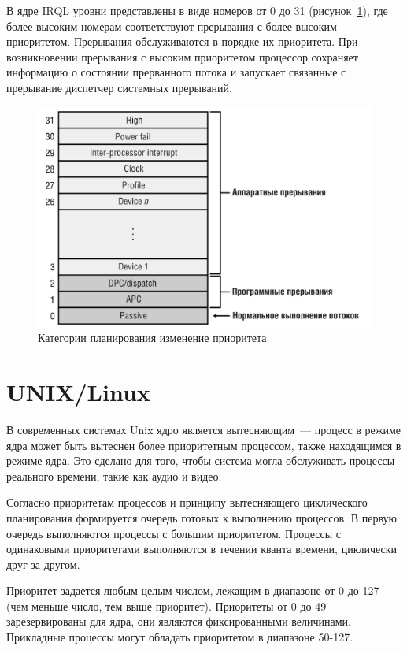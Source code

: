 В ядре IRQL уровни представлены в виде номеров от 0 до 31 (рисунок~\ref{img:irql}), где более высоким номерам соответствуют прерывания с более высоким приоритетом. 
Прерывания обслуживаются в порядке их приоритета. При возникновении прерывания с высоким приоритетом процессор сохраняет информацию о состоянии прерванного потока и запускает связанные с прерывание диспетчер системных прерываний.

\begin{figure}[h]
	\centering
	\includegraphics[height=0.3\textheight]{img/irql.png}
	\caption{Категории планирования изменение приоритета}
	\label{img:irql}
\end{figure}


\section{UNIX/Linux}
В современных системах Unix ядро является вытесняющим~--- процесс в режиме ядра может быть вытеснен более приоритетным процессом, также находящимся в режиме ядра. 
Это сделано для того, чтобы система могла обслуживать процессы реального времени, такие как  аудио и видео.

Согласно приоритетам процессов и принципу вытесняющего циклического планирования формируется очередь готовых к выполнению процессов. 
В первую очередь выполняются процессы с большим приоритетом. 
Процессы с одинаковыми приоритетами выполняются в течении кванта времени, циклически друг за другом.

Приоритет задается любым целым числом, лежащим в диапазоне от 0 до 127 (чем меньше число, тем выше приоритет). 
Приоритеты от 0 до 49 зарезервированы для ядра, они являются фиксированными величинами. Прикладные процессы могут обладать приоритетом в диапазоне 50-127.

